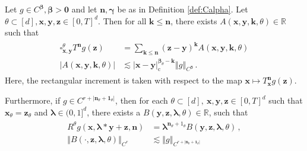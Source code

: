 \documentclass[10pt,a4paper]{amsart}
\def\bR{\mathbb{R}}\def\bS{\mathbb{S}}
\def\fbeta{{\boldsymbol\beta}}
\def\fgamma{{\boldsymbol\gamma}}
\def\fk{\mathbf k}\def\fl{\mathbf l}
\def\flambda{{\boldsymbol\lambda}}
\def\fl{\mathbf l}
\def\fn{\mathbf n}\def\fN{\mathbf N}
\def\fone{{\boldsymbol 1}}
\def\foo{{\boldsymbol 0}}
\def\fx{\mathbf x}
\def\fy{\mathbf y}\def\fz{\mathbf z}
\def\fz{\mathbf z}
\newcommand{\abs}[1]{\left\vert #1 \right\vert}
\newcommand{\compAbs}[1]{\left\vert#1\right\vert_{\text{c}}}
\newcommand{\norm}[1]{\left\Vert #1\right\Vert}
\begin{document}
\begin{lemma}\label{lem:TaylorRecIncrement}
    Let $g\in C^{\fbeta}, \fbeta>\foo$ and let $\fn,\fgamma$ be as in Definition \ref{def:Calpha}. Let $\theta\subset[d], \fx,\fy,\fz\in[0,T]^d$. Then for all $\fk\le\fn$, there exists $A(\fx,\fy,\fk,\theta)\in\bR$ such that
    \begin{align}
    \begin{split}\label{ineq:Taylor1}
        \square^\theta_{\fx,\fy} T^{\fn} g(\fz) &= \sum_{\fk\le\fn} (\fz-\fy)^\fk A(\fx,\fy,\fk,\theta)\\
        \abs{A(\fx,\fy,\fk,\theta)} &\lesssim \compAbs{\fx-\fy}^{\fbeta_\theta-\fk}\norm{g}_{C^\fbeta}\,.
        \end{split}
    \end{align}
    Here, the rectangular increment is taken with respect to the map $\fx\mapsto T^\fn_\fx g(\fz)$.
    
    Furthermore, if $g\in C^{r+\abs{\fn_\theta+\fone_\theta}}$, then for each $\theta\subset[d],~\fx,\fy,\fz\in[0,T]^d$ such that $\fx_\theta = \fz_\theta$ and $\flambda\in(0,1]^d$, there exists a $B(\fy,\fz,\flambda,\theta)\in\bR$, such that
    \begin{align}
    \begin{split}\label{ineq:Taylor2}
        R^\theta g(\fx,\flambda*\fy+\fz,\fn) &= \flambda^{\fn_\theta+1_\theta} B(\fy,\fz,\flambda,\theta)\,, \\
        \norm{B(\cdot,\fz,\flambda,\theta)}_{C^r}&\lesssim \norm{g}_{C^{r+\abs{\fn_\theta+\fone_\theta}}}
    \end{split}
    \end{align}
\end{lemma}
\end{document}
